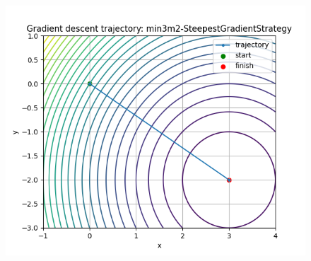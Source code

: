 \documentclass{article}
\begin{document}
\begin{figure}
    \centering
    \includegraphics[width=1\linewidth]{min3m2-SteepestGradientStrategy.png}
    
    
\end{figure}
\end{document}
